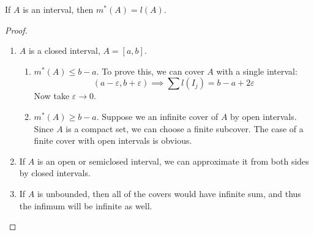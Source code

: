 \begin{proposition}
    If $A$ is an interval, then $m^*(A) = l(A)$.
\end{proposition}
\begin{proof}
    \begin{enumerate}[label=\alph*)]
        \item {
            $A$ is a closed interval, $A = [a, b]$.
            \begin{enumerate}[label=\arabic*.]
                \item {
                    $m^*(A) \le b - a$.
                    To prove this, we can cover $A$ with a single interval:
                    \[ (a - \varepsilon, b + \varepsilon) \implies \sum l(I_j) = b - a + 2\varepsilon \]
                    Now take $\varepsilon \to 0$.
                }
                \item {
                    $m^*(A) \ge b - a$.
                    Suppose we an infinite cover of $A$ by open intervals.
                    Since $A$ is a compact set, we can choose a finite subcover.
                    The case of a finite cover with open intervals is obvious.
                }
            \end{enumerate}
        }
        \item {
            If $A$ is an open or semiclosed interval, we can approximate it from both sides
            by closed intervals.
        }
        \item {
            If $A$ is unbounded, then all of the covers would have infinite sum, and thus 
            the infimum will be infinite as well.
        }
    \end{enumerate}
\end{proof}